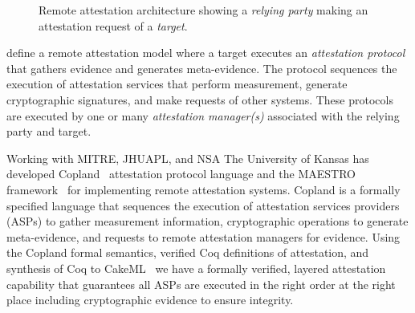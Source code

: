 \documentclass[runningheads]{llncs}
\begin{document}
\begin{figure}[hbtp]
  \centering
  \caption{Remote attestation architecture
  showing a \emph{relying party} making an attestation request of a
  \emph{target}.}
  \label{fig:remote-attestation}
\end{figure}

\citet{Coker::Principles-of-R,Coker:08:Attestation:-Ev} define a
remote attestation model where a target executes an \emph{attestation
  protocol} that gathers evidence and generates meta-evidence.  The
protocol sequences the execution of attestation services that perform
measurement, generate cryptographic signatures, and make requests of
other systems.  These protocols are executed by one or many \emph{attestation
  manager(s)} associated with the relying party and target.

Working with MITRE, JHUAPL, and NSA The University of Kansas has
developed Copland~\citep{Ramsdell:2019aa} attestation protocol language
and the MAESTRO framework~\citep{petz2022innovations} for implementing
remote attestation systems. Copland is a formally specified language
that sequences the execution of attestation services providers (ASPs)
to gather measurement information, cryptographic operations to
generate meta-evidence, and requests to remote attestation managers
for evidence. Using the Copland formal semantics, verified Coq
definitions of attestation, and synthesis of Coq to
CakeML~\citep{Kumar:2014:CVI:2535838.2535841} we have a formally
verified, layered attestation capability that guarantees all ASPs are
executed in the right order at the right place including cryptographic
evidence to ensure integrity.
\end{document}
